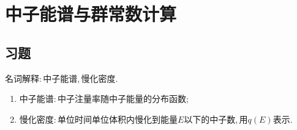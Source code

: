 \chapter{中子能谱与群常数计算}
\section*{习题}

\begin{exercise}
    名词解释:\,中子能谱,\,慢化密度.\,
    \begin{solution}
        \begin{enumerate}[(1)]
            \item 中子能谱:\,中子注量率随中子能量的分布函数;\,
            \item 慢化密度:\,单位时间单位体积内慢化到能量$E$以下的中子数,\,用$q(E)$表示.\,
        \end{enumerate}
    \end{solution}
\end{exercise}

